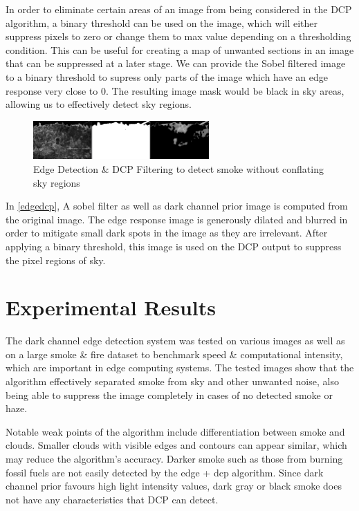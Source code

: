 \label{sobelsky}{}

In order to eliminate certain areas of an image from being considered in
the DCP algorithm, a binary threshold can be used on the image, which
will either suppress pixels to zero or change them to max value
depending on a thresholding condition. This can be useful for creating a
map of unwanted sections in an image that can be suppressed at a later
stage. We can provide the Sobel filtered image to a binary threshold to
supress only parts of the image which have an edge response very close
to 0. The resulting image mask would be black in sky areas, allowing us
to effectively detect sky regions.

\begin{figure}
\centering
\includegraphics[width=0.6\textwidth,height=\textheight]{edgedcp.png}
\caption{Edge Detection \& DCP Filtering to detect smoke without
conflating sky regions}
\end{figure}

\label{edgedcp}{}

In \hyperref[edgedcp]{{[}edgedcp{]}}, A sobel filter as well as dark
channel prior image is computed from the original image. The edge
response image is generously dilated and blurred in order to mitigate
small dark spots in the image as they are irrelevant. After applying a
binary threshold, this image is used on the DCP output to suppress the
pixel regions of sky.

\section{Experimental Results}

The dark channel edge detection system was tested on various images as
well as on a large smoke \& fire dataset to benchmark speed \&
computational intensity, which are important in edge computing systems.
The tested images show that the algorithm effectively separated smoke
from sky and other unwanted noise, also being able to suppress the image
completely in cases of no detected smoke or haze.

Notable weak points of the algorithm include differentiation between
smoke and clouds. Smaller clouds with visible edges and contours can
appear similar, which may reduce the algorithm's accuracy. Darker smoke
such as those from burning fossil fuels are not easily detected by the
edge + dcp algorithm. Since dark channel prior favours high light
intensity values, dark gray or black smoke does not have any
characteristics that DCP can detect.

